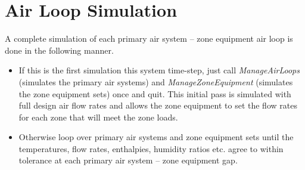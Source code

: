 \section{Air Loop Simulation}\label{air-loop-simulation}

A complete simulation of each primary air system -- zone equipment air loop is done in the following manner.

\begin{itemize}
\item
  If this is the first simulation this system time-step, just call \emph{ManageAirLoops} (simulates the primary air systems) and \emph{ManageZoneEquipment} (simulates the zone equipment sets) once and quit. This initial pass is simulated with full design air flow rates and allows the zone equipment to set the flow rates for each zone that will meet the zone loads.
\item
  Otherwise loop over primary air systems and zone equipment sets until the temperatures, flow rates, enthalpies, humidity ratios etc. agree to within tolerance at each primary air system -- zone equipment gap.
\end{itemize}

